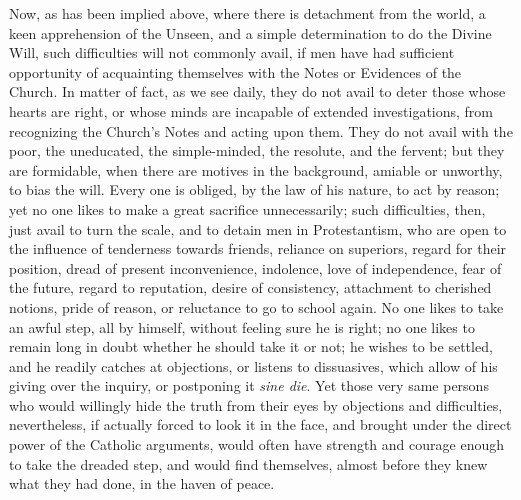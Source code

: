 Now, as has been implied above, where there is detachment from the
world, a keen apprehension of the Unseen, and a simple determination
to do the Divine Will, such difficulties will not commonly avail, if
men have had sufficient opportunity of acquainting themselves with the
Notes or Evidences of the Church. In matter of fact, as we see daily,
they do not avail to deter those whose hearts are right, or whose
minds are incapable of extended investigations, from recognizing the
Church's Notes and acting upon them. They do not avail with the poor,
the uneducated, the simple-minded, the resolute, and the fervent; but
they are formidable, when there are motives in the background, amiable
or unworthy, to bias the will. Every one is obliged, by the law of his
nature, to act by reason; yet no one likes to make a great sacrifice
unnecessarily; such difficulties, then, just avail to turn the scale,
and to detain men in Protestantism, who are open to the influence of
tenderness towards friends, reliance on superiors, regard for their
position, dread of present inconvenience, indolence, love of
independence, fear of the future, regard to reputation, desire of
consistency, attachment to cherished notions, pride of reason, or
reluctance to go to school again. No one likes to take an awful step,
all by himself, without feeling sure he is right; no one likes to
remain long in doubt whether he should take it or not; he wishes to be
settled, and he readily catches at objections, or listens to
dissuasives, which allow of his giving over the inquiry, or postponing
it \emph{sine die}. Yet those very same persons who would willingly
hide the truth from their eyes by objections and difficulties,
nevertheless, if actually forced to look it in the face, and brought
under the direct power of the Catholic arguments, would often have
strength and courage enough to take the dreaded step, and would find
themselves, almost before they knew what they had done, in the haven
of peace.


